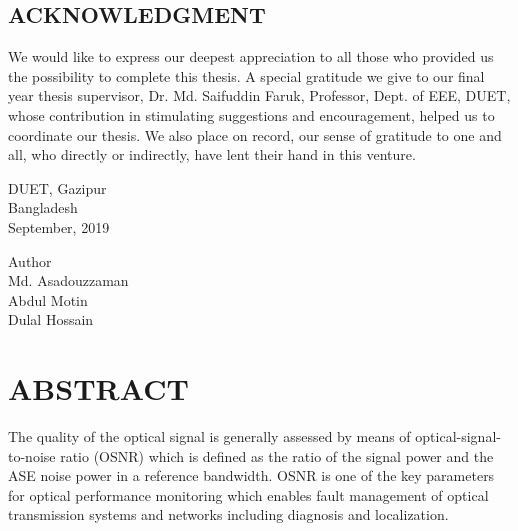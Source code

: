 \documentclass[12pt]{report}
\begin{document}
\begin{center}
	\section*{ACKNOWLEDGMENT}
\end{center}
	We would like to express our deepest appreciation to all those who provided us the possibility to complete this thesis.  A special gratitude we give to our final year thesis  supervisor, Dr. Md. Saifuddin Faruk, Professor, Dept. of EEE, DUET, whose contribution in stimulating suggestions and encouragement,  helped us to coordinate our thesis. We also place on record, our sense of gratitude to one and all, who directly or indirectly, have lent their hand in this venture.\\ [1cm]

		\begin{minipage}[t]{0.3\textwidth}
			\begin{flushleft}
				DUET, Gazipur\\
				Bangladesh\\
				September, 2019
			\end{flushleft}
		\end{minipage}
	\begin{minipage}[t]{0.65\textwidth}
		\begin{flushright}
			Author\\
			Md. Asadouzzaman\\
			Abdul Motin\\
			Dulal Hossain
		\end{flushright}
	\end{minipage}
	
	\pagebreak
	\section*{ABSTRACT}
	The quality of the optical signal is generally assessed by means of optical-signal-to-noise ratio (OSNR) which is defined as the ratio of the signal power and the ASE noise power in a reference bandwidth. OSNR is one of the key parameters for optical performance monitoring which enables fault management of optical transmission systems and networks including diagnosis and localization.
	
\end{document}
